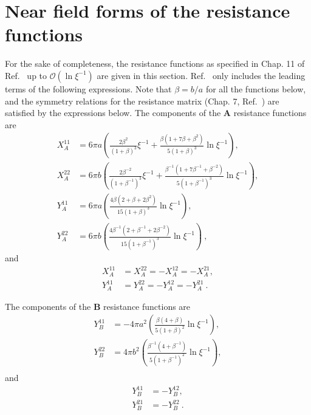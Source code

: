 \documentclass[reprint, amsmath,amssymb,aps,pre,onecolumn,notitlepage%
]{revtex4-1}
\begin{document}
\section{Near field forms of the resistance functions}
\label{sec:components}
For the sake of completeness, the resistance functions as specified in Chap. 11 of Ref.~\cite{KK1991} up to $\mathcal{O}(\ln{\xi^{-1}})$ are given in this section. Ref.~\cite{Mari2014} only includes the leading terms of the following expressions. Note that $\beta=b/a$ for all the functions below, and the symmetry relations for the resistance matrix (Chap. 7, Ref.~\cite{KK1991}) are satisfied by the expressions below.
The components of the $\bm{A}$ resistance functions are
\begin{equation}
\begin{split}
	X_A^{11}&= 6 \pi a \left( \frac{2 \beta^2}{(1+\beta)^3}\xi^{-1} + \frac{\beta (1+ 7 \beta + \beta^2)}{5 (1+\beta)^3} \ln{\xi^{-1}}\right),\\
	X_A^{22}&= 6 \pi b \left( \frac{2 \beta^{-2}}{(1+\beta^{-1})^3}\xi^{-1} + \frac{\beta^{-1} (1+ 7 \beta^{-1} + \beta^{-2})}{5 (1+\beta^{-1})^3} \ln{\xi^{-1}}\right),\\
	Y_A^{11}&= 6 \pi a \left(\frac{4 \beta (2+  \beta + 2\beta^2)}{15 (1+\beta)^3} \ln{\xi^{-1}} \right),\\
	Y_A^{22}&= 6 \pi b \left(\frac{4 \beta^{-1} (2+  \beta^{-1} + 2\beta^{-2})}{15 (1+\beta^{-1})^3} \ln{\xi^{-1}} \right)\ ,
\end{split}
\end{equation}
and 
\begin{equation}
\begin{split}
	X^{11}_A &=X^{22}_A=-X^{12}_A=-X^{21}_A,\\
	Y^{11}_A &=Y^{22}_A=-Y^{12}_A=-Y^{21}_A\ .
\end{split}
\end{equation}


The components of the $\bm{B}$ resistance functions are
\begin{equation}
\begin{split}
	Y_B^{11}&= -4 \pi a^2 \left(\frac{ \beta (4+ \beta)}{5 (1+\beta)^2} \ln{\xi^{-1}} \right),\\
	Y_B^{22}&= 4 \pi b^2 \left(\frac{ \beta^{-1} (4+ \beta^{-1})}{5 (1+\beta^{-1})^2} \ln{\xi^{-1}} \right),\\
\end{split}
\end{equation}
and 
\begin{equation}
\begin{split}
	Y^{11}_B &=-Y^{12}_B,\\  Y^{21}_B &=-Y^{22}_B\ .
\end{split}
\end{equation}
\end{document}
